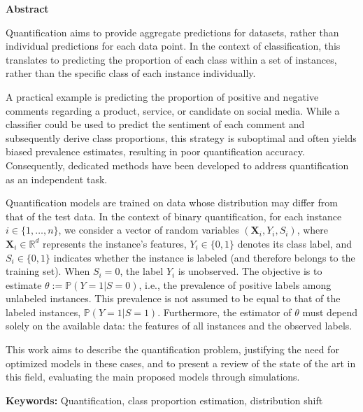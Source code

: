 \begin{center}
  \textbf{\Large Abstract}\label{abstract}
\end{center}

Quantification aims to provide aggregate predictions for datasets, rather than
individual predictions for each data point. In the context of classification,
this translates to predicting the proportion of each class within a set of
instances, rather than the specific class of each instance individually.

A practical example is predicting the proportion of positive and negative
comments regarding a product, service, or candidate on social media. While a
classifier could be used to predict the sentiment of each comment and
subsequently derive class proportions, this strategy is suboptimal and often
yields biased prevalence estimates, resulting in poor quantification accuracy.
Consequently, dedicated methods have been developed to address quantification as
an independent task.

Quantification models are trained on data whose distribution may differ from
that of the test data. In the context of binary quantification, for each
instance $i \in \{1,\dots,n\}$, we consider a vector of random variables
$(\boldsymbol{X}_i,Y_i,S_i)$, where $\boldsymbol{X}_i \in \mathbb{R}^d$
represents the instance's features, $Y_i \in \{0, 1\}$ denotes its class label,
and $S_i \in \{0, 1\}$ indicates whether the instance is labeled (and therefore
belongs to the training set). When $S_i = 0$, the label $Y_i$ is unobserved. The
objective is to estimate $\theta := \mathbb{P}(Y=1|S=0)$, i.e., the prevalence
of positive labels among unlabeled instances. This prevalence is not assumed to
be equal to that of the labeled instances, $\mathbb{P}(Y=1|S=1)$. Furthermore,
the estimator of $\theta$ must depend solely on the available data: the features
of all instances and the observed labels.

This work aims to describe the quantification problem, justifying the need for
optimized models in these cases, and to present a review of the state of the art
in this field, evaluating the main proposed models through simulations.

\bigskip

\textbf{Keywords:} Quantification, class proportion estimation, distribution
shift